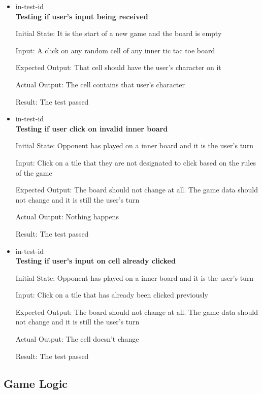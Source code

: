 \documentclass[12pt, titlepage]{article}
\newcounter{UInum}
\newcommand{\ttheUInum}{in-test-id \theUInum}
\begin{document}
\begin{itemize}

\item {\ttheUInum \label{UItest1}\\}
\textbf {Testing if user's input being received}
					
Initial State: It is the start of a new game and the board is empty
					
Input: A click on any random cell of any inner tic tac toe board
					
Expected Output: That cell should have the user's character on it

Actual Output: The cell contains that user's character

Result: The test passed
					
\item {\ttheUInum \label{UItest2}\\}
\textbf{Testing if user click on invalid inner board}
					
Initial State: Opponent has played on a inner board and it is the user's turn

Input: Click on a tile that they are not designated to click based on the
rules of the game
					
Expected Output: The board should not change at all. The game data should not change
and it is still the user's turn

Actual Output: Nothing happens

Result: The test passed

\item {\ttheUInum \label{UItest3}\\}
\textbf{Testing if user's input on cell already clicked}
					
Initial State: Opponent has played on a inner board and it is the user's turn
					
Input: Click on a tile that has already been clicked previously
					
Expected Output: The board should not change at all. The game data should not change
and it is still the user's turn

Actual Output: The cell doesn't change

Result: The test passed

\end{itemize}

\subsection{Game Logic}
\end{document}
